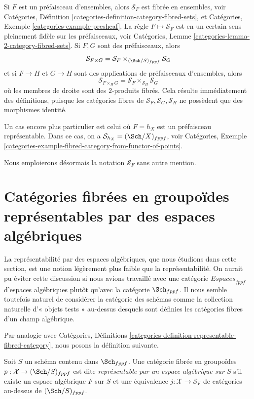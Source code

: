 \medskip\noindent
Si $F$ est un préfaisceau d'ensembles, alors $\mathcal{S}_F$ est
fibrée en ensembles, voir
Catégories,
Définition \ref{categories-definition-category-fibred-sets},
et
Catégories, Exemple \ref{categories-example-presheaf}.
La règle $F \mapsto \mathcal{S}_F$ est en un certain sens pleinement fidèle
sur les préfaisceaux, voir
Catégories, Lemme \ref{categories-lemma-2-category-fibred-sets}.
Si $F, G$ sont des préfaisceaux, alors
$$
\mathcal{S}_{F \times G}
=
\mathcal{S}_F \times_{(\Sch/S)_{fppf}} \mathcal{S}_G
$$
et si $F \to H$ et $G \to H$ sont des applications de préfaisceaux d'ensembles, alors
$$
\mathcal{S}_{F \times_H G} =
\mathcal{S}_F \times_{\mathcal{S}_H} \mathcal{S}_G
$$
où les membres de droite sont des $2$-produits fibrés. Cela résulte immédiatement
des définitions, puisque les catégories fibres de
$\mathcal{S}_F, \mathcal{S}_G, \mathcal{S}_H$ ne possèdent que des morphismes identité.

\medskip\noindent
Un cas encore plus particulier est celui où $F = h_X$ est un préfaisceau
représentable. Dans ce cas, on a
$\mathcal{S}_{h_X} = (\Sch/X)_{fppf}$, voir
Catégories,
Exemple \ref{categories-example-fibred-category-from-functor-of-points}.

\medskip\noindent
Nous emploierons désormais la notation $\mathcal{S}_F$ sans autre mention.





\section{Catégories fibrées en groupoïdes représentables par des espaces algébriques}
\label{section-representable-by-algebraic-spaces}

\noindent
La représentabilité par des espaces algébriques, que nous étudions dans cette section,
est une notion légèrement plus faible que la représentabilité.
On aurait pu éviter cette discussion si nous avions travaillé avec une catégorie
$\textit{Espaces}_{fppf}$ d'espaces algébriques plutôt qu'avec la catégorie
$\Sch_{fppf}$. Il nous semble toutefois naturel de considérer la
catégorie des schémas comme la collection naturelle d'« objets tests » au-dessus
desquels sont définies les catégories fibres d'un champ algébrique.

\medskip\noindent
Par analogie avec Catégories, Définitions
\ref{categories-definition-representable-fibred-category},
nous posons la définition suivante.

\begin{definition}
\label{definition-representable-by-algebraic-space}
Soit $S$ un schéma contenu dans $\Sch_{fppf}$.
Une catégorie fibrée en groupoïdes $p : \mathcal{X} \to (\Sch/S)_{fppf}$
est dite {\it représentable par un espace algébrique sur $S$}
s'il existe un espace algébrique $F$ sur $S$ et une équivalence
$j : \mathcal{X} \to \mathcal{S}_F$
de catégories au-dessus de $(\Sch/S)_{fppf}$.
\end{definition}

